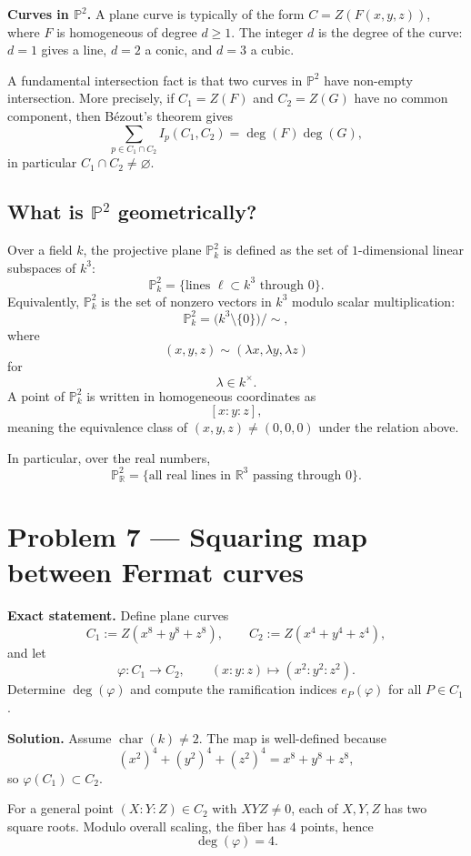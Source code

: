 \documentclass[12pt,a4paper]{article}
\theoremstyle{plain}
\theoremstyle{definition}      %
\begin{document}
\textbf{Curves in \(\mathbb P^2\).}
A plane curve is typically of the form \(C=Z(F(x,y,z))\), where \(F\) is homogeneous of degree \(d\ge 1\).
The integer \(d\) is the degree of the curve: \(d=1\) gives a line, \(d=2\) a conic, and \(d=3\) a cubic.

A fundamental intersection fact is that two curves in \(\mathbb P^2\) have non-empty intersection.
More precisely, if \(C_1=Z(F)\) and \(C_2=Z(G)\) have no common component, then Bézout's theorem gives
\[
\sum_{p\in C_1\cap C_2} I_p(C_1,C_2)=\deg(F)\deg(G),
\]
in particular \(C_1\cap C_2\neq\varnothing\).

\subsection*{What is \(\mathbb P^2\) geometrically?}

Over a field \(k\), the projective plane \(\mathbb P^2_k\) is defined as the set of \(1\)-dimensional linear subspaces of \(k^3\):
\[
\mathbb P^2_k
=
\bigl\{
\text{lines } \ell \subset k^3 \text{ through } 0
\bigr\}.
\]
Equivalently, \(\mathbb P^2_k\) is the set of nonzero vectors in \(k^3\) modulo scalar multiplication:
\[
\mathbb P^2_k
=
\bigl(k^3\setminus\{0\}\bigr)\big/\sim,
\]
where
\[
(x,y,z)\sim(\lambda x,\lambda y,\lambda z)
\]
for
\[
\lambda\in k^\times.
\]
A point of \(\mathbb P^2_k\) is written in homogeneous coordinates as
\[
[x:y:z],
\]
meaning the equivalence class of \((x,y,z)\neq (0,0,0)\) under the relation above.

In particular, over the real numbers,
\[
\mathbb P^2_{\mathbb R}
=
\bigl\{
\text{all real lines in }\mathbb R^3 \text{ passing through } 0
\bigr\}.
\]

\section*{Problem 7 — Squaring map between Fermat curves}

\textbf{Exact statement.}
Define plane curves
\[
C_1:=Z(x^8+y^8+z^8),
\qquad
C_2:=Z(x^4+y^4+z^4),
\]
and let
\[
\varphi:C_1\to C_2,
\qquad
(x:y:z)\mapsto (x^2:y^2:z^2).
\]
Determine \(\deg(\varphi)\) and compute the ramification indices \(e_P(\varphi)\) for all \(P\in C_1\).

\textbf{Solution.}
Assume \(\operatorname{char}(k)\neq 2\).
The map is well-defined because
\[
(x^2)^4+(y^2)^4+(z^2)^4=x^8+y^8+z^8,
\]
so \(\varphi(C_1)\subset C_2\).

For a general point \((X:Y:Z)\in C_2\) with \(XYZ\neq 0\), each of \(X,Y,Z\) has two square roots.
Modulo overall scaling, the fiber has \(4\) points, hence
\[
\deg(\varphi)=4.
\]
\end{document}
